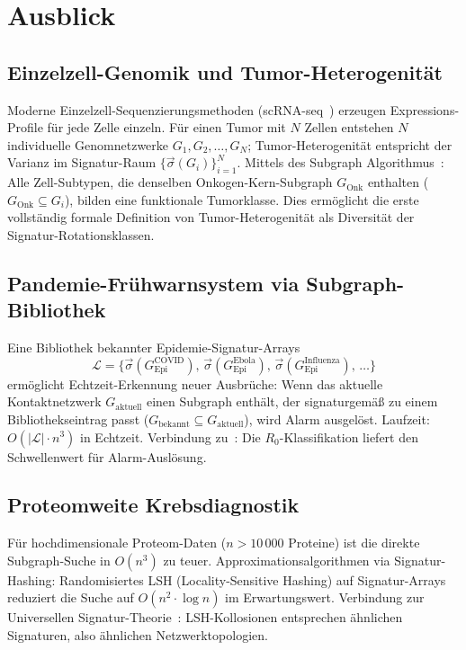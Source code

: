 ﻿\documentclass[a4paper,12pt]{article}
\theoremstyle{plain}
\theoremstyle{definition}
\theoremstyle{remark}
\newcommand{\Gepi}{G_{\mathrm{Epi}}}
\newcommand{\sigvec}{\vec{\sigma}}
\begin{document}
\section{Ausblick}

\subsection{Einzelzell-Genomik und Tumor-Heterogenit\"at}

Moderne Einzelzell-Sequenzierungsmethoden (scRNA-seq~\cite{tang2009})
erzeugen Expressions-Profile f\"ur jede Zelle einzeln.
F\"ur einen Tumor mit $N$ Zellen entstehen $N$ individuelle Genomnetzwerke
$G_1, G_2, \ldots, G_N$; Tumor-Heterogenit\"at entspricht der Varianz
im Signatur-Raum $\{\sigvec(G_i)\}_{i=1}^N$.
Mittels des Subgraph Algorithmus~\cite{epp2026subgraph}:
Alle Zell-Subtypen, die denselben Onkogen-Kern-Subgraph $G_{\mathrm{Onk}}$ enthalten
($G_{\mathrm{Onk}} \subseteq G_i$), bilden eine funktionale Tumorklasse.
Dies erm\"oglicht die erste vollst\"andig formale Definition von
Tumor-Heterogenit\"at als Diversit\"at der Signatur-Rotationsklassen.

\subsection{Pandemie-Fr\"uhwarnsystem via Subgraph-Bibliothek}

Eine Bibliothek bekannter Epidemie-Signatur-Arrays
\[
\mathcal{L} = \bigl\{\sigvec(\Gepi^{\mathrm{COVID}}),\,
\sigvec(\Gepi^{\mathrm{Ebola}}),\,
\sigvec(\Gepi^{\mathrm{Influenza}}),\, \ldots\bigr\}
\]
erm\"oglicht Echtzeit-Erkennung neuer Ausbrüche:
Wenn das aktuelle Kontaktnetzwerk $G_{\mathrm{aktuell}}$ einen Subgraph
enth\"alt, der signaturgem\"a{\ss} zu einem Bibliothekseintrag passt
($G_{\mathrm{bekannt}} \subseteq G_{\mathrm{aktuell}}$), wird Alarm ausgel\"ost.
Laufzeit: $O(|\mathcal{L}| \cdot n^3)$ in Echtzeit.
Verbindung zu~\cite{epp2026r0}: Die $R_0$-Klassifikation
liefert den Schwellenwert f\"ur Alarm-Ausl\"osung.

\subsection{Proteomweite Krebsdiagnostik}

F\"ur hochdimensionale Proteom-Daten ($n > 10\,000$ Proteine) ist
die direkte Subgraph-Suche in $O(n^3)$ zu teuer.
Approximationsalgorithmen via Signatur-Hashing:
Randomisiertes LSH (Locality-Sensitive Hashing) auf Signatur-Arrays
reduziert die Suche auf $O(n^2 \cdot \log n)$ im Erwartungswert.
Verbindung zur Universellen Signatur-Theorie~\cite{epp2026ust}:
LSH-Kollosionen entsprechen \"ahnlichen Signaturen, also \"ahnlichen
Netzwerktopologien.
\end{document}
